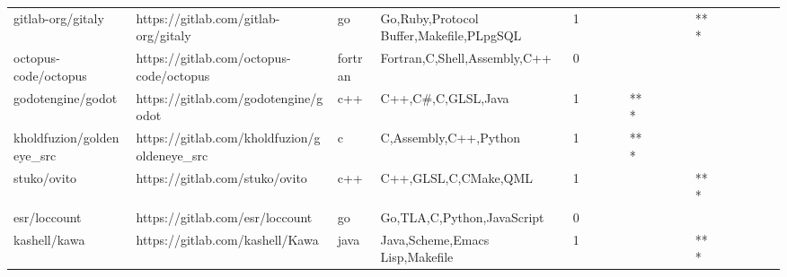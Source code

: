 \begin{tabular}{llllrlllllllllllll}
gitlab-org/gitaly                                  &               https://gitlab.com/gitlab-org/gitaly &                go &           Go,Ruby,Protocol Buffer,Makefile,PLpgSQL &       1 &         &        &           &                &                 &        &           &       *** &          &          &       &              &          \\
octopus-code/octopus                               &            https://gitlab.com/octopus-code/octopus &           fortran &                       Fortran,C,Shell,Assembly,C++ &       0 &         &        &           &                &                 &        &           &           &          &          &       &              &          \\
godotengine/godot                                  &               https://gitlab.com/godotengine/godot &               c++ &                                 C++,C\#,C,GLSL,Java &       1 &         &        &           &            *** &                 &        &           &           &          &          &       &              &          \\
kholdfuzion/goldeneye\_src                          &       https://gitlab.com/kholdfuzion/goldeneye\_src &                 c &                              C,Assembly,C++,Python &       1 &         &        &           &            *** &                 &        &           &           &          &          &       &              &          \\
stuko/ovito                                        &                     https://gitlab.com/stuko/ovito &               c++ &                               C++,GLSL,C,CMake,QML &       1 &         &        &           &                &                 &        &           &       *** &          &          &       &              &          \\
esr/loccount                                       &                    https://gitlab.com/esr/loccount &                go &                         Go,TLA,C,Python,JavaScript &       0 &         &        &           &                &                 &        &           &           &          &          &       &              &          \\
kashell/kawa                                       &                    https://gitlab.com/kashell/Kawa &              java &                    Java,Scheme,Emacs Lisp,Makefile &       1 &         &        &           &                &                 &        &           &       *** &          &          &       &              &          \\

\end{tabular}
